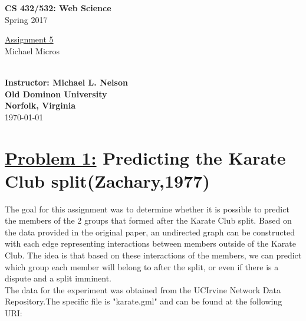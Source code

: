 \documentclass{article}
\begin{document}

\begin{titlepage}

\vspace*{45 pt}
\begin{center}
\Huge{\bf CS 432/532:  Web Science}\\
\huge{Spring 2017\\}

\vspace{60 pt}
\Huge\underline {Assignment 5}\\

\vspace{10 pt}
\Huge{Michael Micros}\\\

{\Large \bf {Instructor: Michael L. Nelson}}\\

\vspace{230 pt}
{\huge \bf {Old Dominon University}}\\
{\huge \bf {Norfolk, Virginia}}\\

\vspace{10 pt}
\today

\end{center}
\end{titlepage}





\section*{{\underline{\huge {Problem 1:}} Predicting the Karate Club split(Zachary,1977)}}

The goal for this assignment was to determine whether it is possible to predict the members of  the 2 groups that formed after the Karate Club split. Based on the data provided in the original paper, an undirected graph can be constructed with each edge representing interactions between members outside of the Karate Club. The idea is that based on these interactions of the members, we can predict  which group each member will belong to after the split, or even if there is a dispute and a split imminent.\\
The data for the experiment was obtained from the UCIrvine Network Data Repository.The specific file is "karate.gml" and can be found at the following URI:\\
\end{document}
